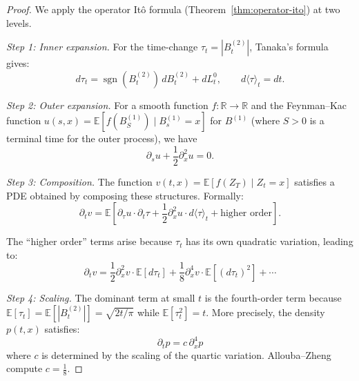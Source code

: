 \documentclass[12pt]{article}
\theoremstyle{plain}
\theoremstyle{definition}
\theoremstyle{remark}
\newcommand{\E}{\mathbb{E}}
\newcommand{\R}{\mathbb{R}}
\newcommand{\sgn}{\operatorname{sgn}}
\begin{document}
\begin{proof}
We apply the operator It\^{o} formula (Theorem~\ref{thm:operator-ito}) at two levels.

\emph{Step 1: Inner expansion.} For the time-change $\tau_t = |B_t^{(2)}|$, Tanaka's formula gives:
\begin{equation}\label{eq:inner-expansion}
d\tau_t = \sgn(B_t^{(2)}) \, dB_t^{(2)} + dL_t^0, \qquad d\langle \tau \rangle_t = dt.
\end{equation}

\emph{Step 2: Outer expansion.} For a smooth function $f: \R \to \R$ and the Feynman--Kac function $u(s,x) = \E[f(B_S^{(1)}) \mid B_s^{(1)} = x]$ for $B^{(1)}$ (where $S > 0$ is a terminal time for the outer process), we have
\begin{equation}\label{eq:outer-FK}
\partial_s u + \frac{1}{2}\partial_x^2 u = 0.
\end{equation}

\emph{Step 3: Composition.} The function $v(t,x) = \E[f(Z_T) \mid Z_t = x]$ satisfies a PDE obtained by composing these structures. Formally:
\begin{equation}\label{eq:composition}
\partial_t v = \E\left[\partial_\tau u \cdot \partial_t \tau + \frac{1}{2}\partial_x^2 u \cdot d\langle \tau \rangle_t + \text{higher order}\right].
\end{equation}

The ``higher order'' terms arise because $\tau_t$ has its own quadratic variation, leading to:
\begin{equation}\label{eq:higher-order}
\partial_t v = \frac{1}{2}\partial_x^2 v \cdot \E[d\tau_t] + \frac{1}{8}\partial_x^4 v \cdot \E[(d\tau_t)^2] + \cdots
\end{equation}

\emph{Step 4: Scaling.} The dominant term at small $t$ is the fourth-order term because $\E[\tau_t] = \E[|B_t^{(2)}|] = \sqrt{2t/\pi}$ while $\E[\tau_t^2] = t$. More precisely, the density $p(t,x)$ satisfies:
\begin{equation}\label{eq:density-biharmonic}
\partial_t p = c \, \partial_x^4 p
\end{equation}
where $c$ is determined by the scaling of the quartic variation. Allouba--Zheng \cite{AlloubaZheng2001} compute $c = \frac{1}{8}$.
\end{proof}
\end{document}
